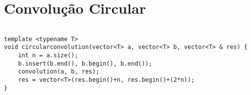 \section{Convolução Circular}
\begin{lstlisting}

template <typename T>
void circularconvolution(vector<T> a, vector<T> b, vector<T> & res) {
	int n = a.size();
	b.insert(b.end(), b.begin(), b.end());
	convolution(a, b, res);
	res = vector<T>(res.begin()+n, res.begin()+(2*n));
}

\end{lstlisting}

